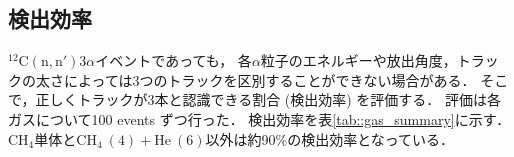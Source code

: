 \documentclass[../master]{subfiles}
\begin{document}
\subsection{検出効率}
${}^{12}\mathrm{C}(\mathrm{n},\mathrm{n}')3\alpha$イベントであっても，
各$\alpha$粒子のエネルギーや放出角度，トラックの太さによっては3つのトラックを区別することができない場合がある．
そこで，正しくトラックが3本と認識できる割合 (検出効率) を評価する．
評価は各ガスについて100 events ずつ行った．
検出効率を表\ref{tab::gas_summary}に示す．
$\mathrm{CH}_{4}$単体と$\mathrm{CH}_{4}\ (4) + \mathrm{He}\ (6)$以外は約90\%の検出効率となっている．

\end{document}
